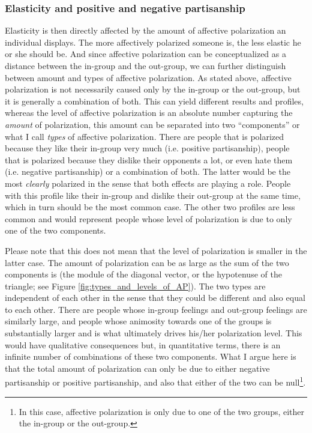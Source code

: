 \documentclass[a4paper, svgnames]{article}
\begin{document}
\subsubsection{Elasticity and positive and negative partisanship}

Elasticity is then directly affected by the amount of affective polarization an individual displays. The more affectively polarized someone is, the less elastic he or she should be. And since affective polarization can be conceptualized as a distance between the in-group and the out-group, we can further distinguish between amount and types of affective polarization. As stated above, affective polarization is not necessarily caused only by the in-group or the out-group, but it is generally a combination of both. This can yield different results and profiles, whereas the level of affective polarization is an absolute number capturing the \textit{amount} of polarization, this amount can be separated into two ``components'' or what I call \textit{types} of affective polarization. There are people that is polarized because they like their in-group very much (i.e. positive partisanship), people that is polarized because they dislike their opponents a lot, or even hate them (i.e.  negative partisanship) or a combination of both. The latter would be the most \textit{clearly} polarized in the sense that both effects are playing a role. People with this profile like their in-group and dislike their out-group at the same time, which in turn should be the most common case. The other two profiles are less common and would represent people whose level of polarization is due to only one of the two components.

Please note that this does not mean that the level of polarization is smaller in the latter case. The amount of polarization can be as large as the sum of the two components is (the module of the diagonal vector, or the hypotenuse of the triangle; see Figure \ref*{fig:types_and_levels_of_AP}). The two types are independent of each other in the sense that they could be different and also equal to each other. There are people whose in-group feelings and out-group feelings are similarly large, and people whose animosity towards one of the groups is substantially larger and is what ultimately drives his/her polarization level. This would have qualitative consequences but, in quantitative terms, there is an infinite number of combinations of these two components. What I argue here is that the total amount of polarization can only be due to either negative partisanship or positive partisanship, and also that either of the two can be null\footnote{In this case, affective polarization is only due to one of the two groups, either the in-group or the out-group.}.
\end{document}
